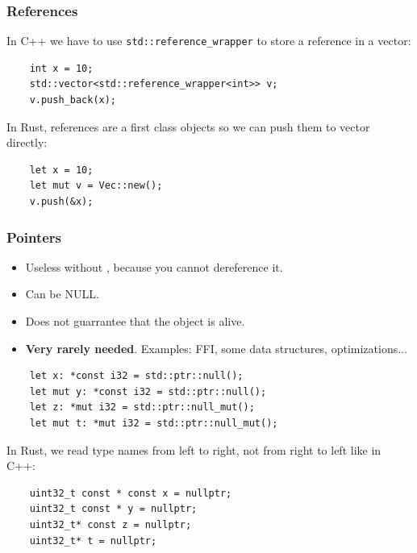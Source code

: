 \documentclass[aspectratio=1610,t]{beamer}
\begin{document}

\begin{frame}[fragile]
\frametitle{References}
In C++ we have to use \texttt{std::reference\_wrapper} to store a reference in a vector:

\begin{verbatim}
    int x = 10;
    std::vector<std::reference_wrapper<int>> v;
    v.push_back(x);
\end{verbatim}

In Rust, references are a first class objects so we can push them to vector directly:

\begin{verbatim}
    let x = 10;
    let mut v = Vec::new();
    v.push(&x);
\end{verbatim}
\end{frame}


\begin{frame}[fragile]
\frametitle{Pointers}
\begin{itemize}
    \item Useless without , because you cannot dereference it.
    \item Can be NULL.
    \item Does not guarrantee that the object is alive.
    \item \textbf{Very rarely needed}. Examples: FFI, some data structures, optimizations...
\end{itemize}

\begin{verbatim}
    let x: *const i32 = std::ptr::null();
    let mut y: *const i32 = std::ptr::null();
    let z: *mut i32 = std::ptr::null_mut();
    let mut t: *mut i32 = std::ptr::null_mut();
\end{verbatim}

In Rust, we read type names from left to right, not from right to left like in C++:

\begin{verbatim}
    uint32_t const * const x = nullptr;
    uint32_t const * y = nullptr;
    uint32_t* const z = nullptr;
    uint32_t* t = nullptr;
\end{verbatim}
\end{frame}

\end{document}
